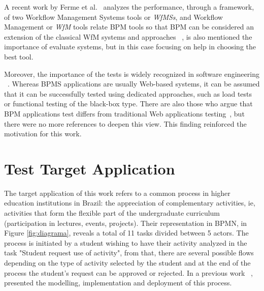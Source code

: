 \documentclass[runningheads,a4paper]{llncs}
\begin{document}
A recent work by Ferme et al.~\cite{bpmbenchmarking} analyzes the performance, through a framework, of two Workflow Management Systems tools or \emph{WfMSs}, and Workflow Management or \emph{WfM} tools relate BPM tools so that BPM can be considered an extension of the classical WfM systems and approaches ~\cite{wfm}, is also mentioned the importance of evaluate systems, but in this case focusing on help in choosing the best tool. %

Moreover, the importance of the tests is widely recognized in software engineering ~\cite{swebok14}. 
Whereas BPMS applications are usually Web-based systems, it can be assumed that it can be successfully tested using dedicated approaches, such as load tests or functional testing of the black-box type. There are also those who argue that BPM applications test differs from traditional Web applications testing~\cite{evoke}, but there were no more references to deepen this view. This finding reinforced the motivation for this work. 


\section{Test Target Application}\label{s:apli}


The target application of this work refers to a common process in higher education institutions in Brazil: the appreciation of complementary activities, ie, activities that form the flexible part of the undergraduate curriculum (participation in lectures, events, projects). Their representation in BPMN, in Figure \ref{fig:diagrama}, reveals a total of 11 tasks divided between 5 actors. The process is initiated by a student wishing to have their activity analyzed in the task "Student request use of activity", from that, there are several possible flows depending on the type of activity selected by the student and at the end of the process the student's request can be approved or rejected. In a previous work ~\cite{sbsi2013}, presented the modelling, implementation and deployment of this process. 
\end{document}
